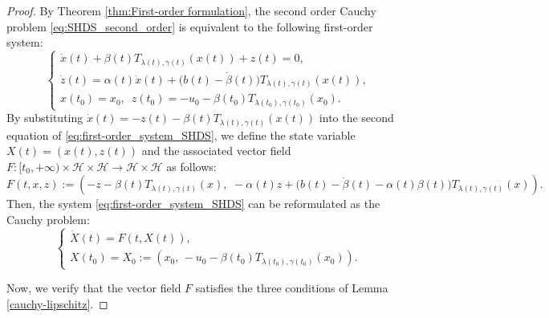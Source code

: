\documentclass{article}
\theoremstyle{definition}
\theoremstyle{definition}
\theoremstyle{definition}
\begin{document}
\begin{proof}
By Theorem \ref{thm:First-order formulation}, the second order Cauchy problem \eqref{eq:SHDS_second_order} is equivalent to the following first-order system:
\begin{equation}
\label{eq:first-order_system_SHDS}
\begin{cases}
\dot{x}(t) + \beta(t)T_{\lambda(t), \gamma(t)}(x(t)) + z(t) = 0, \\
\dot{z}(t) = \alpha(t)\dot{x}(t) + \big(b(t) - \dot{\beta}(t)\big)T_{\lambda(t), \gamma(t)}(x(t)), \\
x(t_0) = x_0, \,\,\, z(t_0) = -u_0 - \beta(t_0)T_{\lambda(t_0), \gamma(t_0)}(x_0).
\end{cases}
\end{equation}
By substituting $\dot{x}(t) = -z(t) - \beta(t)T_{\lambda(t), \gamma(t)}(x(t))$ into the second equation of \eqref{eq:first-order_system_SHDS}, we define the state variable $X(t) = (x(t), z(t))$ and the associated vector field $F: [t_0, +\infty) \times \mathcal{H} \times \mathcal{H} \to \mathcal{H} \times \mathcal{H}$ as follows:
\begin{equation}
\label{eq:vector_field_F_SHDS}
F(t, x, z) := \left( -z - \beta(t)T_{\lambda(t), \gamma(t)}(x), \,\, -\alpha(t)z + \big(b(t) - \dot{\beta}(t) - \alpha(t)\beta(t)\big)T_{\lambda(t), \gamma(t)}(x) \right).
\end{equation}
Then, the system \eqref{eq:first-order_system_SHDS} can be reformulated as the Cauchy problem:
\begin{equation*}
\begin{cases}
\dot{X}(t) = F(t, X(t)),\\
X(t_0) = X_0 := \left( x_0, \,-u_0 - \beta(t_0)T_{\lambda(t_0), \gamma(t_0)}(x_0) \right).
\end{cases}
\end{equation*}

Now, we verify that the vector field $F$ satisfies the three conditions of Lemma \ref{cauchy-lipschitz}.


\end{proof}
\end{document}
